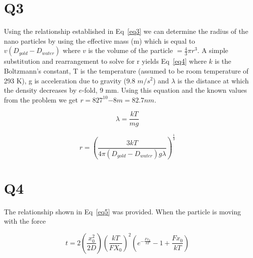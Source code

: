 \documentclass[12pt]{article}
\begin{document}
\section{Q3}
Using the relationship established in Eq~\ref{eq3} we can determine the radius of the nano particles by using the effective mass (m) which is equal to $v(D_{gold}-D_{water})$ where $v$ is the volume of the particle $ = \frac{4}{3}\pi r^3$. A simple substitution and rearrangement to solve for r yields Eq~\ref{eq4} where $k$ is the Boltzmann's constant, T is the temperature (assumed to be room temperature of 293 K), g is acceleration due to gravity (9.8 $m/s^2$) and $\lambda$ is the distance at which the density decreases by $e$-fold, 9 mm.  Using this equation and the known values from the problem we get $r = 827^10{-8} m = 82.7 nm$.

\begin{equation}
\lambda = \frac{kT}{mg}
\label{eq3}
\end{equation}

\begin{equation}
r = (\frac{3kT}{4\pi(D_{gold}-D_{water})g\lambda})^{\frac{1}{3}}
\label{eq4}
\end{equation}

\section{Q4}
The relationship shown in Eq~\ref{eq5} was provided. When the particle is moving with the force 

\begin{equation}
t = 2(\frac{x^2_0}{2D})(\frac{kT}{FX_0})^2(e^{-\frac{Fx_0}{kT}}-1+\frac{Fx_0}{kT})
\label{eq5}
\end{equation}
\end{document}

